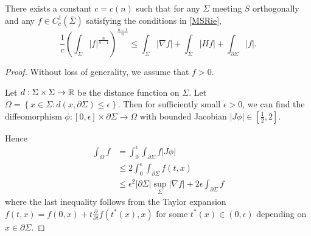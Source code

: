 \begin{theorem} \label{MSwithextra}
    There exists a constant $c=c(n)$ such that for any $\Sigma $ meeting $S$ orthogonally and any $f \in C_{c}^{1}(\bar{\Sigma})$ satisfying the conditions in \autoref{MSRie},
    \[\frac{1}{c}(\int_{\Sigma} \left| f \right| ^{\frac{n}{n-1}})^{\frac{n-1}{n}}\leq \int_{\Sigma} \left| \nabla f \right| +\int_{\Sigma} \left| Hf \right| +\int_{\partial \Sigma} \left| f \right| .\]
\end{theorem}

\begin{proof}
    Without loss of generality, we assume that $f>0$.
    
    Let $d:\Sigma \times \Sigma \to \mathbb{R}$ be the distance function on $\Sigma $. Let $\Omega=\left\{ x \in \Sigma : d(x,\partial \Sigma ) \leq \epsilon \right\}$. Then for sufficiently small $\epsilon >0$, we can find the diffeomorphism $\phi : [0,\epsilon ] \times \partial \Sigma \to \Omega $ with bounded Jacobian $\left| J \phi  \right| \in [\frac{1}{2}, 2] $.
    
    Hence
    \begin{equation} \label{bdyest}
    \begin{split}
        \int_{\Omega }^{}f 
    &= \int_{0}^{\epsilon }\int_{\partial \Sigma} f \left| J \phi  \right|  \\
    & \leq 2 \int_{0}^{\epsilon }\int_{\partial \Sigma} f(t,x)  \\
    & \leq \epsilon ^2 \left| \partial \Sigma  \right| \sup _{\Sigma }\left| \nabla f \right| +2 \epsilon \int_{\partial \Sigma} f
    \end{split}
    \end{equation} 
    where the last inequality follows from the Taylor expansion $f(t,x)=f(0,x)+t \frac{\partial }{\partial t} f (t^*(x),x)$ for some $t^*(x) \in (0,\epsilon )$ depending on $x \in \partial \Sigma .$
    

\end{proof}
